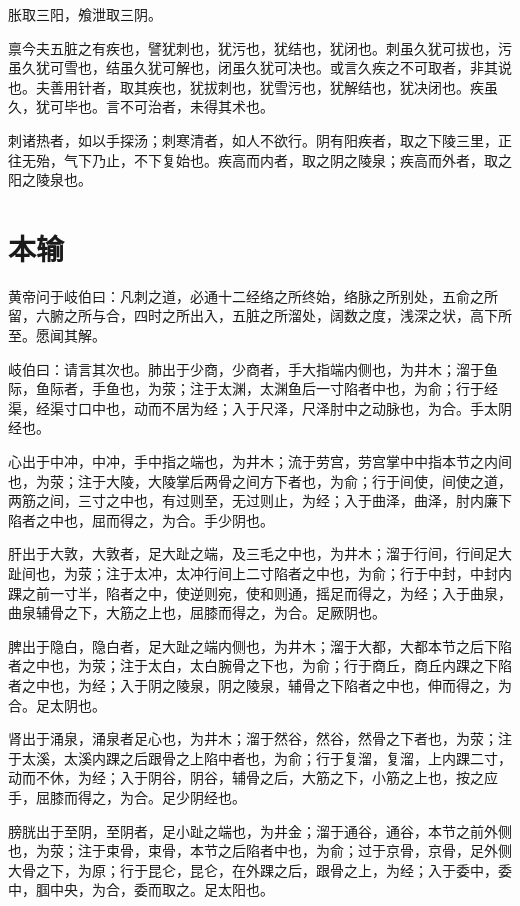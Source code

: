 \documentclass[a4paper,12pt,UTF8,twoside]{ctexbook}
\begin{document}
	胀取三阳，飧泄取三阴。
	
	禀今夫五脏之有疾也，譬犹刺也，犹污也，犹结也，犹闭也。刺虽久犹可拔也，污虽久犹可雪也，结虽久犹可解也，闭虽久犹可决也。或言久疾之不可取者，非其说也。夫善用针者，取其疾也，犹拔刺也，犹雪污也，犹解结也，犹决闭也。疾虽久，犹可毕也。言不可治者，未得其术也。
	
	刺诸热者，如以手探汤；刺寒清者，如人不欲行。阴有阳疾者，取之下陵三里，正往无殆，气下乃止，不下复始也。疾高而内者，取之阴之陵泉；疾高而外者，取之阳之陵泉也。
	\chapter{本输}
	
	黄帝问于岐伯曰：凡刺之道，必通十二经络之所终始，络脉之所别处，五俞之所留，六腑之所与合，四时之所出入，五脏之所溜处，阔数之度，浅深之状，高下所至。愿闻其解。
	
	岐伯曰：请言其次也。肺出于少商，少商者，手大指端内侧也，为井木；溜于鱼际，鱼际者，手鱼也，为荥；注于太渊，太渊鱼后一寸陷者中也，为俞；行于经渠，经渠寸口中也，动而不居为经；入于尺泽，尺泽肘中之动脉也，为合。手太阴经也。
	
	心出于中冲，中冲，手中指之端也，为井木；流于劳宫，劳宫掌中中指本节之内间也，为荥；注于大陵，大陵掌后两骨之间方下者也，为俞；行于间使，间使之道，两筋之间，三寸之中也，有过则至，无过则止，为经；入于曲泽，曲泽，肘内廉下陷者之中也，屈而得之，为合。手少阴也。
	
	肝出于大敦，大敦者，足大趾之端，及三毛之中也，为井木；溜于行间，行间足大趾间也，为荥；注于太冲，太冲行间上二寸陷者之中也，为俞；行于中封，中封内踝之前一寸半，陷者之中，使逆则宛，使和则通，摇足而得之，为经；入于曲泉，曲泉辅骨之下，大筋之上也，屈膝而得之，为合。足厥阴也。
	
	脾出于隐白，隐白者，足大趾之端内侧也，为井木；溜于大都，大都本节之后下陷者之中也，为荥；注于太白，太白腕骨之下也，为俞；行于商丘，商丘内踝之下陷者之中也，为经；入于阴之陵泉，阴之陵泉，辅骨之下陷者之中也，伸而得之，为合。足太阴也。
	
	肾出于涌泉，涌泉者足心也，为井木；溜于然谷，然谷，然骨之下者也，为荥；注于太溪，太溪内踝之后跟骨之上陷中者也，为俞；行于复溜，复溜，上内踝二寸，动而不休，为经；入于阴谷，阴谷，辅骨之后，大筋之下，小筋之上也，按之应手，屈膝而得之，为合。足少阴经也。
	
	膀胱出于至阴，至阴者，足小趾之端也，为井金；溜于通谷，通谷，本节之前外侧也，为荥；注于束骨，束骨，本节之后陷者中也，为俞；过于京骨，京骨，足外侧大骨之下，为原；行于昆仑，昆仑，在外踝之后，跟骨之上，为经；入于委中，委中，腘中央，为合，委而取之。足太阳也。
	
\end{document}
